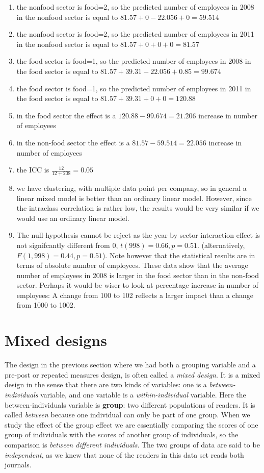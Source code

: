 \documentclass[]{book}\usepackage[]{graphicx}\usepackage[]{color}
\begin{document}
\begin{enumerate}
\item the nonfood sector is food=2, so the predicted number of employees in 2008 in the nonfood sector is equal to $81.57 + 0 -22.056 + 0= 59.514$
\item the nonfood sector is food=2, so the predicted number of employees in 2011 in the nonfood sector is equal to $81.57 + 0 + 0 + 0= 81.57$
\item the food sector is food=1, so the predicted number of employees in 2008 in the food sector is equal to $81.57 + 39.31 -22.056 + 0.85=99.674 $
\item the food sector is food=1, so the predicted number of employees in 2011 in the food sector is equal to $81.57 + 39.31 + 0 + 0 = 120.88   $ 
\item in the food sector the effect is a $120.88 - 99.674 =   21.206$ increase in number of employees
\item in the non-food sector the effect is a $81.57 - 59.514 =   22.056$ increase in number of employees
\item the ICC is $\frac{12}{12+208}=0.05$
\item we have clustering, with multiple data point per company, so in general a linear mixed model is better than an ordinary linear model. However, since the intraclass correlation is rather low, the results would be very similar if we would use an ordinary linear model.
\item The null-hypothesis cannot be reject as the year by sector interaction effect is not signifcantly different from 0, $t(998)=0.66, p=0.51$. (alternatively, $F(1,998)=0.44, p=0.51$). Note however that the statistical results are in terms of absolute number of employees. These data show that the average number of employees in 2008 is larger in the food sector than in the non-food sector. Perhaps it would be wiser to look at percentage increase in number of employees: A change from 100 to 102 reflects a larger impact than a change from 1000 to 1002.

\end{enumerate}





\section{Mixed designs}
The design in the previous section where we had both a grouping variable and a pre-post or repeated measures design, is often called a \textit{mixed design}. It is a mixed design in the sense that there are two kinds of variables: one is a \textit{between-individuals} variable, and one variable is a \textit{within-individual} variable. Here the between-individuals variable is \textbf{group}: two different populations of readers. It is called \textit{between} because one individual can only be part of one group. When we study the effect of the group effect we are essentially comparing the scores of one group of individuals with the scores of another group of individuals, so the comparison is \textit{between different individuals}. 
The two groups of data are said to be \textit{independent}, as we knew that none of the readers in this data set reads both journals. 
\end{document}
